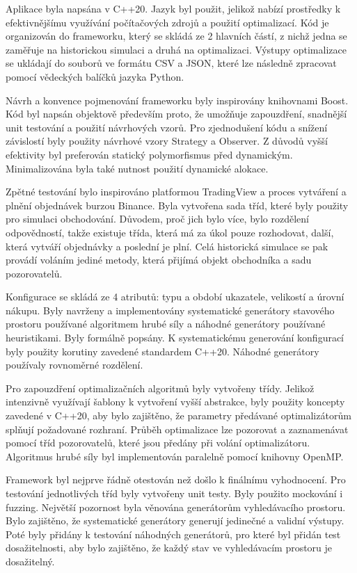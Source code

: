 Aplikace byla napsána v C++20.
Jazyk byl použit, jelikož nabízí prostředky k efektivnějšímu využívání počítačových zdrojů a použití optimalizací.
Kód je organizován do frameworku, který se skládá ze 2 hlavních částí, z nichž jedna se zaměřuje na historickou simulaci a druhá na optimalizaci.
Výstupy optimalizace se ukládají do souborů ve formátu CSV a JSON, které lze následně zpracovat pomocí vědeckých balíčků jazyka Python.

Návrh a konvence pojmenování frameworku byly inspirovány knihovnami Boost.
Kód byl napsán objektově především proto, že umožňuje zapouzdření, snadnější unit testování a použití návrhových vzorů.
Pro zjednodušení kódu a snížení závislostí byly použity návrhové vzory Strategy a Observer.
Z důvodů vyšší efektivity byl preferován statický polymorfismus před dynamickým.
Minimalizována byla také nutnost použití dynamické alokace.

Zpětné testování bylo inspirováno platformou TradingView a proces vytváření a plnění objednávek burzou Binance.
Byla vytvořena sada tříd, které byly použity pro simulaci obchodování.
Důvodem, proč jich bylo více, bylo rozdělení odpovědností, takže existuje třída, která má za úkol pouze rozhodovat, další, která vytváří objednávky a poslední je plní.
Celá historická simulace se pak provádí voláním jediné metody, která přijímá objekt obchodníka a sadu pozorovatelů.

Konfigurace se skládá ze 4 atributů: typu a období ukazatele, velikostí a úrovní nákupu.
Byly navrženy a implementovány systematické generátory stavového prostoru používané algoritmem hrubé síly a náhodné generátory používané heuristikami.
Byly formálně popsány.
K systematickému generování konfigurací byly použity korutiny zavedené standardem C++20.
Náhodné generátory používaly rovnoměrné rozdělení.

Pro zapouzdření optimalizačních algoritmů byly vytvořeny třídy.
Jelikož intenzivně využívají šablony k vytvoření vyšší abstrakce, byly použity koncepty zavedené v C++20, aby bylo zajištěno, že parametry předávané optimalizátorům splňují požadované rozhraní.
Průběh optimalizace lze pozorovat a zaznamenávat pomocí tříd pozorovatelů, které jsou předány při volání optimalizátoru.
Algoritmus hrubé síly byl implementován paralelně pomocí knihovny OpenMP.

Framework byl nejprve řádně otestován než došlo k finálnímu vyhodnocení.
Pro testování jednotlivých tříd byly vytvořeny unit testy.
Byly použito mockování i fuzzing.
Největší pozornost byla věnována generátorům vyhledávacího prostoru.
Bylo zajištěno, že systematické generátory generují jedinečné a validní výstupy.
Poté byly přidány k testování náhodných generátorů, pro které byl přidán test dosažitelnosti, aby bylo zajištěno, že každý stav ve vyhledávacím prostoru je dosažitelný.


